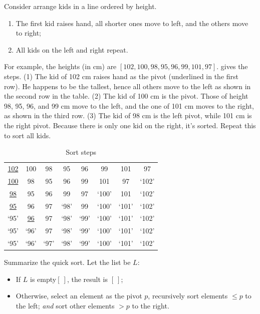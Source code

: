 \documentclass[b5paper]{article}
\begin{document}
Consider arrange kids in a line ordered by height.

\begin{enumerate}
\item The first kid raises hand, all shorter ones move to left, and the others move to right;
\item All kids on the left and right repeat.
\end{enumerate}

For example, the heights (in cm) are $[102, 100, 98, 95, 96, 99, 101, 97]$.  gives the steps. (1) The kid of 102 cm raises hand as the pivot (underlined in the first row). He happens to be the tallest, hence all others move to the left as shown in the second row in the table. (2) The kid of 100 cm is the pivot. Those of height 98, 95, 96, and 99 cm move to the left, and the one of 101 cm moves to the right, as shown in the third row. (3) The kid of 98 cm is the left pivot, while 101 cm is the right pivot. Because there is only one kid on the right, it's sorted. Repeat this to sort all kids.

\begin{table}[htbp]
\centering
\begin{tabular}{ | c c c c c c c c |}
\hline
\underline{102} & 100 & 98 & 95 & 96 & 99 & 101 & 97 \\
\underline{100} & 98 & 95 & 96 & 99 & 101 & 97 & `102' \\
\underline{98} & 95 & 96 & 99 & 97 & `100' & 101 & `102' \\
\underline{95} & 96 & 97 & `98' & 99 & `100' & `101' & `102' \\
`95' & \underline{96} & 97 & `98' & `99' & `100' & `101' & `102' \\
`95' & `96' & 97 & `98' & `99' & `100' & `101' & `102' \\
`95' & `96' & `97' & `98' & `99' & `100' & `101' & `102' \\
\hline
\end{tabular}
\caption{Sort steps}
\label{tab:kids-sort}
\end{table}

Summarize the quick sort. Let the list be $L$:

\begin{itemize}
\item If $L$ is empty$[\ ]$, the result is $[\ ]$;
\item Otherwise, select an element as the pivot $p$, recursively sort elements $\leq p$ to the left; {\em and} sort other elements $> p$ to the right.
\end{itemize}
\end{document}
